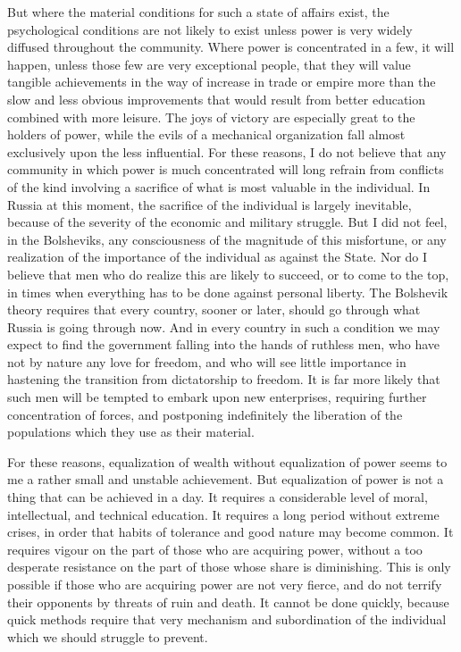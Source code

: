 But where the material conditions for such a state of affairs exist, the psychological conditions are not likely to exist unless power is very widely diffused throughout the community. Where power is concentrated in a few, it will happen, unless those few are very exceptional people, that they will value tangible achievements in the way of increase in trade or empire more than the slow and less obvious improvements that would result from better education combined with more leisure. The joys of victory are especially great to the holders of power, while the evils of a mechanical organization fall almost exclusively upon the less influential. For these reasons, I do not believe that any community in which power is much concentrated will long refrain from conflicts of the kind involving a sacrifice of what is most valuable in the individual. In Russia at this moment, the sacrifice of the individual is largely inevitable, because of the severity of the economic and military struggle. But I did not feel, in the Bolsheviks, any consciousness of the magnitude of this misfortune, or any realization of the importance of the individual as against the State. Nor do I believe that men who do realize this are likely to succeed, or to come to the top, in times when everything has to be done against personal liberty. The Bolshevik theory requires that every country, sooner or later, should go through what Russia is going through now. And in every country in such a condition we may expect to find the government falling into the hands of ruthless men, who have not by nature any love for freedom, and who will see little importance in hastening the transition from dictatorship to freedom. It is far more likely that such men will be tempted to embark upon new enterprises, requiring further concentration of forces, and postponing indefinitely the liberation of the populations which they use as their material.

For these reasons, equalization of wealth without equalization of power seems to me a rather small and unstable achievement. But equalization of power is not a thing that can be achieved in a day. It requires a considerable level of moral, intellectual, and technical education. It requires a long period without extreme crises, in order that habits of tolerance and good nature may become common. It requires vigour on the part of those who are acquiring power, without a too desperate resistance on the part of those whose share is diminishing. This is only possible if those who are acquiring power are not very fierce, and do not terrify their opponents by threats of ruin and death. It cannot be done quickly, because quick methods require that very mechanism and subordination of the individual which we should struggle to prevent.

